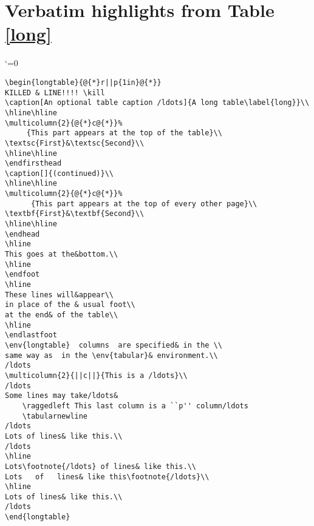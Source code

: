 
\finalclearpage
\section{Verbatim highlights from Table \protect\ref{long}}
\label{listing}
\begingroup\catcode`\/=0
\begin{verbatim}
\begin{longtable}{@{*}r||p{1in}@{*}}
KILLED & LINE!!!! \kill
\caption[An optional table caption /ldots]{A long table\label{long}}\\
\hline\hline
\multicolumn{2}{@{*}c@{*}}%
     {This part appears at the top of the table}\\
\textsc{First}&\textsc{Second}\\
\hline\hline
\endfirsthead
\caption[]{(continued)}\\
\hline\hline
\multicolumn{2}{@{*}c@{*}}%
      {This part appears at the top of every other page}\\
\textbf{First}&\textbf{Second}\\
\hline\hline
\endhead
\hline
This goes at the&bottom.\\
\hline
\endfoot
\hline
These lines will&appear\\
in place of the & usual foot\\
at the end& of the table\\
\hline
\endlastfoot
\env{longtable}  columns  are specified& in the \\
same way as  in the \env{tabular}& environment.\\
/ldots
\multicolumn{2}{||c||}{This is a /ldots}\\
/ldots
Some lines may take/ldots&
    \raggedleft This last column is a ``p'' column/ldots
    \tabularnewline
/ldots
Lots of lines& like this.\\
/ldots
\hline
Lots\footnote{/ldots} of lines& like this.\\
Lots   of   lines& like this\footnote{/ldots}\\
\hline
Lots of lines& like this.\\
/ldots
\end{longtable}
\end{verbatim}
\endgroup